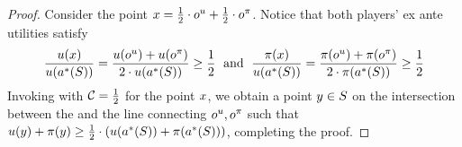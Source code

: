 \begin{proof}
    Consider the point $x=\frac{1}{2}\cdot o^u + \frac{1}{2}\cdot o^\pi$. Notice that both players' ex ante utilities satisfy
    \begin{align*}
        \frac{u(x)}{u(a^*(S))}
        =
        \frac{u(o^u)+u(o^\pi)}{2\cdot u(a^*(S))}
        \geq 
        \frac{1}{2}
        \;
        \mbox{ and }
        \;
        \frac{\pi(x)}{u(a^*(S))}
        =
        \frac{\pi(o^u)+\pi(o^\pi)}{2\cdot \pi(a^*(S))}
        \geq 
        \frac{1}{2}
    \end{align*}    
    Invoking  with $\mathcal{C}=\frac{1}{2}$ for the point $x$, we obtain a point $y\in S$ on the intersection between the {\ksline} and the line connecting $o^u, o^\pi$ such that $u(y)+\pi(y)\geq \frac{1}{2} \cdot (u(a^*(S)) +\pi(a^*(S)))$, completing the proof.
\end{proof}

